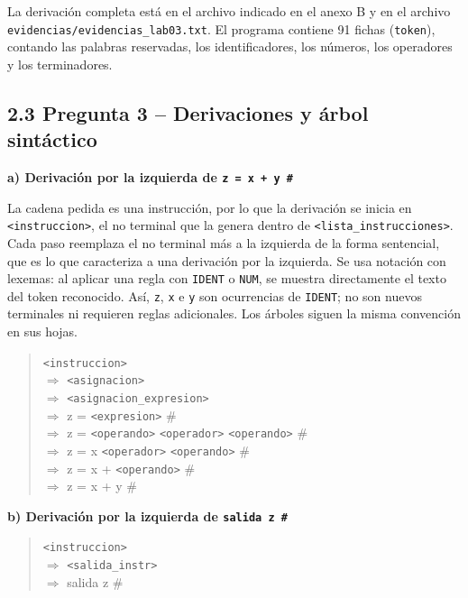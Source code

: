 \documentclass[11pt,letterpaper]{article}
\newcommand{\apartado}[1]{\par\Needspace{4\baselineskip}\medskip\noindent\textbf{#1}\par\nobreak\smallskip}
\newcommand{\nt}[1]{\texttt{\textless #1\textgreater}}
\begin{document}
La derivación completa está en el archivo indicado en el anexo B y en
el archivo \texttt{evidencias/\allowbreak evidencias\_lab03.txt}. El programa contiene 91 fichas
(\texttt{token}), contando las palabras reservadas, los identificadores, los números, los
operadores y los terminadores.

\subsection*{2.3 Pregunta 3 -- Derivaciones y árbol sintáctico}

\apartado{a) Derivación por la izquierda de \texttt{z = x + y \#}}

La cadena pedida es una instrucción, por lo que la derivación se inicia en \nt{instruccion}, el no
terminal que la genera dentro de \nt{lista\_instrucciones}. Cada paso reemplaza el no terminal más
a la izquierda de la forma sentencial, que es lo que caracteriza a una derivación por la
izquierda. Se usa notación con lexemas: al aplicar una regla con \texttt{IDENT} o \texttt{NUM},
se muestra directamente el texto del token reconocido. Así, \texttt{z}, \texttt{x} e \texttt{y}
son ocurrencias de \texttt{IDENT}; no son nuevos terminales ni requieren reglas adicionales.
Los árboles siguen la misma convención en sus hojas.

\begin{quote}\small\ttfamily
\nt{instruccion}\\
$\Rightarrow$ \nt{asignacion} \quad [P04]\\
$\Rightarrow$ \nt{asignacion\_expresion} \quad [P08]\\
$\Rightarrow$ z = \nt{expresion} \# \quad [P10]\\
$\Rightarrow$ z = \nt{operando} \nt{operador} \nt{operando} \# \quad [P13]\\
$\Rightarrow$ z = x \nt{operador} \nt{operando} \# \quad [P14]\\
$\Rightarrow$ z = x + \nt{operando} \# \quad [P16]\\
$\Rightarrow$ z = x + y \# \quad [P14]
\end{quote}

\apartado{b) Derivación por la izquierda de \texttt{salida z \#}}

\begin{quote}\small\ttfamily
\nt{instruccion}\\
$\Rightarrow$ \nt{salida\_instr} \quad [P05]\\
$\Rightarrow$ salida z \# \quad [P21]
\end{quote}
\end{document}
